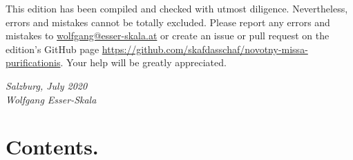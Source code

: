 \documentclass[parskip=full]{scrreprt}
\newif\iftemplate\templatetrue
\begin{document}
This edition has been compiled and checked with utmost diligence. Nevertheless, errors and mistakes cannot be totally excluded. Please report any errors and mistakes to \url{wolfgang@esser-skala.at} or create an issue or pull request on the edition’s GitHub page \url{https://github.com/skafdasschaf/novotny-missa-purificationis}. Your help will be greatly appreciated.

\bigskip
\textit{Salzburg, July 2020\\
Wolfgang Esser-Skala}

\cleardoublepage
\chapter*{Contents.}


\cleardoublepage
\fi

\iftemplate

\fi
\end{document}
